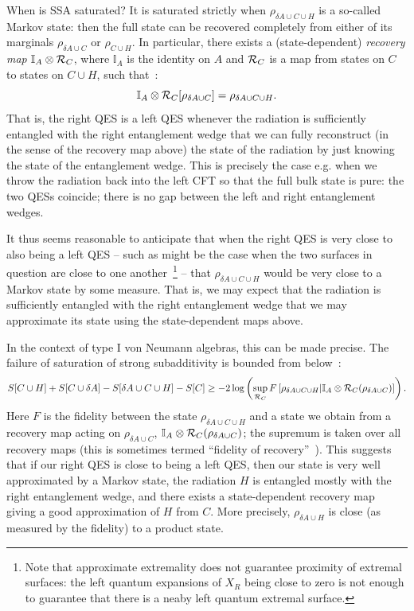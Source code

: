 \documentclass[12pt]{article}
\renewcommand{\ln}{\log}
\begin{document}
When is SSA saturated? It is saturated strictly when $\rho_{\delta A\cup C\cup H}$ is a so-called Markov state: then the full state can be recovered completely from either of its marginals $\rho_{\delta A \cup C}$ or $\rho_{C\cup H}$. In particular, there exists a (state-dependent) \textit{recovery map} $\mathbb{I}_{A}\otimes{\cal R}_{C}$, where $\mathbb{I}_{A}$ is the identity on $A$ and ${\cal R}_{C}$ is a map from states on $C$ to states on $C\cup H$, such that~\cite{HayJoz04}:
\begin{equation}
\mathbb{I}_{A}\otimes{\cal R}_{C}[\rho_{\delta A\cup C}]=\rho_{\delta A \cup C\cup H}.
\end{equation}
That is, the right QES is a left QES whenever the radiation is sufficiently entangled with the right entanglement wedge that we can fully reconstruct (in the sense of the recovery map above) the state of the radiation by just knowing the state of the entanglement wedge. This is precisely the case e.g.  when we throw the radiation back into the left CFT so that the full bulk state is pure: the two QESs coincide; there is no gap between the left and right entanglement wedges.

It thus seems reasonable to anticipate that when the right QES is very close to also being a left QES -- such as might be the case when the two surfaces in question are close to one another~\footnote{Note that approximate extremality does not guarantee proximity of extremal surfaces: the left quantum expansions of $X_{R}$ being close to zero is not enough to guarantee that there is a neaby left quantum extremal surface.} -- that $\rho_{\delta A \cup C\cup H}$ would be very close to a Markov state by some measure. That is, we may expect that the radiation is sufficiently entangled with the right entanglement wedge that we may approximate its state using the state-dependent maps above.

In the context of type I von Neumann algebras, this can be made precise. The failure of saturation of strong subadditivity is bounded from below~\cite{FawRen14, SutFaw15}:
\begin{equation}\label{eq:FRBound}
S[C\cup H]+S[C\cup \delta A] -S[\delta A\cup C\cup H]-S[C] \geq -2 \ln \left (\sup \limits_{{\cal R}_{C}}F \left [\rho_{\delta A \cup C \cup H} | \mathbb{I}_{A}\otimes{\cal R}_{C}(\rho_{\delta A\cup C}) \right]\right).
\end{equation}
Here $F$ is the fidelity between the state $\rho_{\delta A\cup C\cup H}$ and a state we obtain from a recovery map acting on $\rho_{\delta A\cup C}$, $\mathbb{I}_{A}\otimes{\cal R}_{C}(\rho_{\delta A\cup C})$; the supremum is taken over all recovery maps (this is sometimes termed ``fidelity of recovery''~\cite{BerTom15, SesWil15}). This suggests that if our right QES is close to being a left QES, then our state is very well approximated by a Markov state, the radiation $H$ is entangled mostly with the right entanglement wedge, and there exists a state-dependent recovery map giving a good approximation of $H$ from $C$. More precisely, $\rho_{\delta A\cup H}$ is close (as measured by the fidelity) to a product state.
\end{document}
